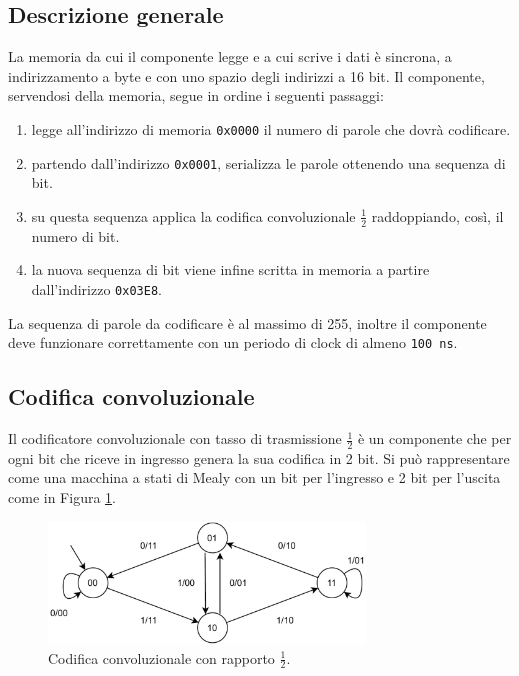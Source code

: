 \documentclass[fleqn,11pt]{article}
\begin{document}
\subsection{Descrizione generale}
La memoria da cui il componente legge e a cui scrive i dati è sincrona, a indirizzamento a byte e con uno spazio degli indirizzi a 16 bit. 
Il componente, servendosi della memoria, segue in ordine i seguenti passaggi:
\begin{enumerate}
    \item legge all'indirizzo di memoria \verb|0x0000| il numero di parole che dovrà codificare.
    \item partendo dall'indirizzo \verb|0x0001|, serializza le parole ottenendo una sequenza di bit.
    \item su questa sequenza applica la codifica convoluzionale \(\frac{1}{2}\) raddoppiando, così, il numero di bit.
    \item la nuova sequenza di bit viene infine scritta in memoria a partire dall'indirizzo \verb|0x03E8|.
\end{enumerate}
La sequenza di parole da codificare è al massimo di 255, inoltre il componente deve funzionare correttamente con un periodo di clock di almeno \verb|100 ns|.  

\subsection{Codifica convoluzionale}
Il codificatore convoluzionale con tasso di trasmissione \(\frac{1}{2}\) è un componente che per ogni bit che riceve in ingresso genera la sua codifica in 2 bit.
Si può rappresentare come una macchina a stati di Mealy con un bit per l'ingresso e 2 bit per l'uscita come in Figura \ref{fig:codconv}.

\begin{figure}[b]
    \centering
    \includegraphics[width=0.75\textwidth]{codconv}
    \caption{Codifica convoluzionale con rapporto \(\frac{1}{2}\).}
    \label{fig:codconv}
\end{figure}
\end{document}
